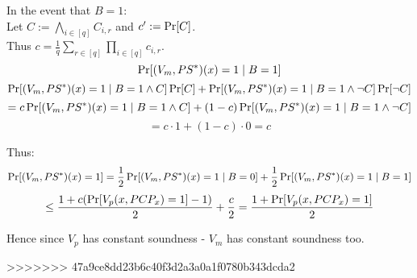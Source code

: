 \begin{itemize}
		In the event that $B=1$:\\
		Let $C:=\bigwedge_{i\in[q]}C_{i,r}$ and $c':=\operatorname*{Pr}[C]$.\\
		Thus $c=\frac{1}{q}\sum_{r\in[q]}\prod_{i\in[q]}c_{i,r}$.\\
		\[
			\operatorname*{Pr}[(V_m,PS^*)(x)=1\mid B=1]
		\]
		\[
			\operatorname*{Pr}[(V_m,PS^*)(x)=1\mid B=1\wedge C]\operatorname*{Pr}[C]
			+\operatorname*{Pr}[(V_m,PS^*)(x)=1\mid B=1\wedge \neg C]\operatorname*{Pr}[\neg C]
		\]
		\[
			=c\operatorname*{Pr}[(V_m,PS^*)(x)=1\mid B=1\wedge C]
			+(1-c)\operatorname*{Pr}[(V_m,PS^*)(x)=1\mid B=1\wedge \neg C]
		\]
		\[
			=c\cdot 1+(1-c)\cdot 0=c
		\]

		Thus:
		\[
			\operatorname*{Pr}[(V_m,PS^*)(x)=1]
			=\frac{1}{2}\operatorname*{Pr}[(V_m,PS^*)(x)=1\mid B=0]+\frac{1}{2}\operatorname*{Pr}[(V_m,PS^*)(x)=1\mid B=1]
		\]
		\[
			\leq \frac{1+c(\operatorname*{Pr}[V_p(x, PCP_x)=1]-1)}{2}+\frac{c}{2}=\frac{1+\operatorname*{Pr}[V_p(x, PCP_x)=1]}{2}
		\]

		Hence since $V_p$ has constant soundness - $V_m$ has constant soundness too.
\end{itemize}
>>>>>>> 47a9ce8dd23b6c40f3d2a3a0a1f0780b343dcda2
